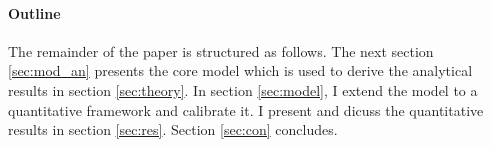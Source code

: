\paragraph{Outline}
The remainder of the paper is structured as follows. The next section \ref{sec:mod_an} presents the core model which is used to derive the analytical results in section \ref{sec:theory}. In section \ref{sec:model}, I extend the model to a quantitative framework and calibrate it. I present and dicuss the quantitative results in section \ref{sec:res}. Section \ref{sec:con} concludes.